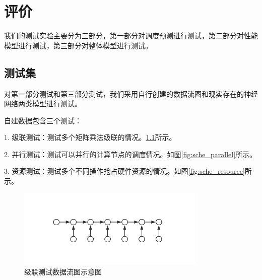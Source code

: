 \chapter{评价}
\label{cha:eval}
    我们的测试实验主要分为三部分，第一部分对调度预测进行测试，第二部分对性能模型进行测试，第三部分对整体模型进行测试。
    
\section{测试集}
    对第一部分测试和第三部分测试，我们采用自行创建的数据流图和现实存在的神经网络两类模型进行测试。
    
    自建数据包含三个测试：
    
    1. 级联测试：测试多个矩阵乘法级联的情况。\ref{fig:sche_cascade}所示。
    
    2. 并行测试：测试可以并行的计算节点的调度情况。如图\ref{fig:sche_parallel}所示。

    3. 资源测试：测试多个不同操作抢占硬件资源的情况。如图\ref{fig:sche_resource}所示。

    \begin{figure}[!htbp]
        \centering
        \includegraphics[width=0.8\textwidth]{figures/sche_cascade.jpg}
        \caption{级联测试数据流图示意图}
        \label{fig:sche_cascade}
    \end{figure}

